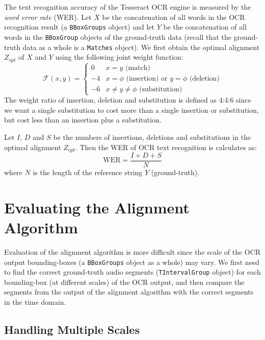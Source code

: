 The text recognition accuracy of the Tesseract OCR engine is measured by the \textit{word error rate} (WER). Let $X$ be the concatenation of all words in the OCR recognition result (a \texttt{BBoxGroups} object) and let $Y$ be the concatenation of all words in the \texttt{BBoxGroup} objects of the ground-truth data (recall that the ground-truth data as a whole is a \texttt{Matches} object). We first obtain the optimal alignment $Z_{opt}$ of $X$ and $Y$ using the following joint weight function:
\begin{equation}
    \mathcal{F}(x,y) = 
    \begin{cases}
        0 & x = y \text{ (match)} \\
        -4 & x = \phi \text{ (insertion) or } y = \phi \text{ (deletion)} \\
        -6 & x \neq y \neq \phi \text{ (substitution)}
    \end{cases}
\end{equation}
The weight ratio of insertion, deletion and substitution is defined as 4:4:6 since we want a single substitution to cost more than a single insertion or substitution, but cost less than an insertion plus a substitution. 

Let $I$, $D$ and $S$ be the numbers of insertions, deletions and substitutions in the optimal alignment $Z_{opt}$. Then the WER of OCR text recognition is calculates as:
\begin{equation}
    \text{WER} = \frac{I + D + S}{N}
\end{equation}
where $N$ is the length of the reference string $Y$ (ground-truth).


\section{Evaluating the Alignment Algorithm}

Evaluation of the alignment algorithm is more difficult since the scale of the OCR output bounding-boxes (a \texttt{BBoxGroups} object as a whole) may vary. We first need to find the correct ground-truth audio segments (\texttt{TIntervalGroup} object) for each bounding-box (at different scales) of the OCR output, and then compare the segments from the output of the alignment algorithm with the correct segments in the time domain. 

\subsection{Handling Multiple Scales}

